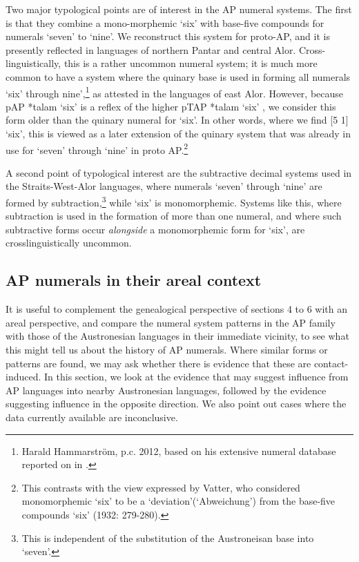 Two major typological points are of interest in the AP numeral systems. The first is that they combine a mono-morphemic `six' with base-five compounds for numerals `seven' to `nine'. We reconstruct this system for proto-AP, and it is presently reflected in languages of northern Pantar and central Alor. Cross-linguistically, this is a rather uncommon numeral system; it is much more common to have a system where the quinary base is used in forming all numerals `six' through nine',\footnote{{}   Harald Hammarstr\"om, p.c. 2012, based on his extensive numeral database reported on in \citet{Hammarstrom2010}.} as attested in the languages of east Alor. However, because pAP *talam `six' is a reflex of the higher pTAP *talam `six' \citep{SchapperEtAlTV}, we consider this form older than the quinary numeral for `six'. In other words, where we find [5 1] `six', this is viewed as a later extension of the quinary system that was already in use for `seven' through `nine' in proto AP.\footnote{{}   This contrasts with the view expressed by Vatter, who considered monomorphemic `six' to be a `deviation'(`Abweichung') from the base-five compounds `six' (1932: 279-280).}\nocite{Vatter1932}

A second point of typological interest are the subtractive decimal systems used in the Straits-West-Alor languages, where numerals `seven' through `nine' are formed by subtraction,\footnote{{}   This is independent of the substitution of the Austroneisan base into `seven'.} while `six' is monomorphemic. Systems like this, where subtraction is used in the formation of more than one numeral, and where such subtractive forms occur \textit{alongside} a monomorphemic form for `six', are crosslinguistically uncommon. 

\subsection{AP numerals in their areal context}\label{sec:6:7.2}
It is useful to complement the genealogical perspective of sections 4 to 6 with an areal perspective, and compare the numeral system patterns in the AP family with those of the Austronesian languages in their immediate vicinity, to see what this might tell us about the history of AP numerals. Where similar forms or patterns are found, we may ask whether there is evidence that these are contact-induced. In this section, we look at the evidence that may suggest influence from AP languages into nearby Austronesian languages, followed by the evidence suggesting influence in the opposite direction. We also point out cases where the data currently available are inconclusive. 

